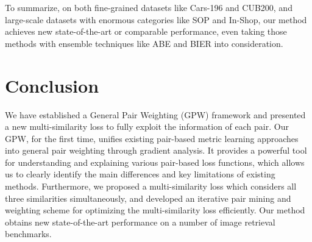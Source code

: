 \documentclass[10pt,twocolumn,letterpaper]{article}
\begin{document}
To summarize, on both fine-grained datasets like Cars-196 and CUB200, and large-scale datasets with enormous categories like SOP and In-Shop, our method achieves new state-of-the-art or comparable performance, even taking those methods with ensemble techniques like ABE and BIER into consideration.  

\section{Conclusion}
We have established a General Pair Weighting (GPW) framework and presented a new multi-similarity loss to fully exploit the information of each pair. Our GPW, for the first time, unifies existing pair-based metric learning approaches into general pair weighting through gradient analysis. It provides a powerful tool for understanding and explaining various pair-based loss functions, which allows us to clearly identify the main differences and key limitations of existing methods. Furthermore, we proposed a multi-similarity loss which considers all three similarities simultaneously, and developed an iterative pair mining and weighting scheme for optimizing the multi-similarity loss efficiently. Our method obtains new state-of-the-art performance on a number of image retrieval benchmarks.
{\small
	
	
}

\clearpage
\clearpage



\end{document}
